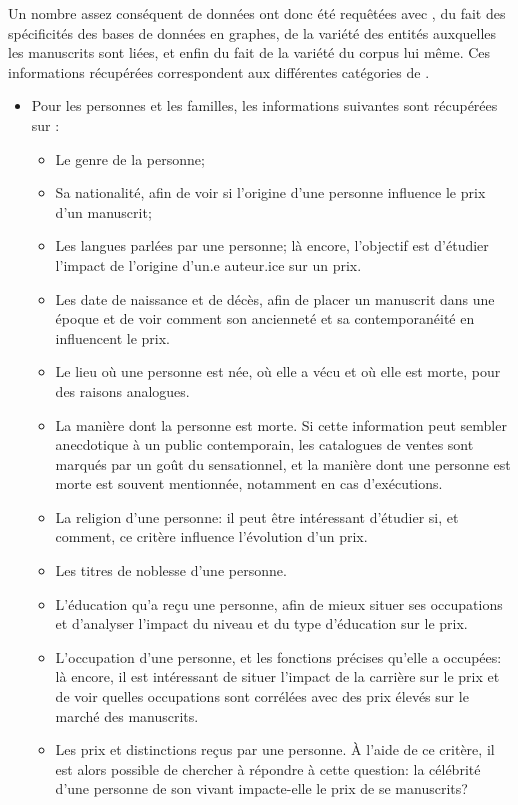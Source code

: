 Un nombre assez conséquent de données ont donc été requêtées avec \sparql{}, du fait des spécificités des bases de données en graphes, de la variété des entités \wkd{} auxquelles les manuscrits sont liées, et enfin du fait de la variété du corpus lui même. Ces informations récupérées correspondent aux différentes catégories de \wkd{}.
\begin{itemize}
	\item Pour les personnes et les familles, les informations suivantes sont récupérées sur \wkd{}:
	\begin{itemize}
		\item Le genre de la personne;
		\item Sa nationalité, afin de voir si l'origine d'une personne influence le prix d'un manuscrit;
		\item Les langues parlées par une personne; là encore, l'objectif est d'étudier l'impact de l'origine d'un.e auteur.ice sur un prix.
		\item Les date de naissance et de décès, afin de placer un manuscrit dans une époque et de voir comment son ancienneté et sa contemporanéité en influencent le prix.
		\item Le lieu où une personne est née, où elle a vécu et où elle est morte, pour des raisons analogues.
		\item La manière dont la personne est morte. Si cette information peut sembler anecdotique à un public contemporain, les catalogues de ventes sont marqués par un goût du sensationnel, et la manière dont une personne est morte est souvent mentionnée, notamment en cas d'exécutions.
		\item La religion d'une personne: il peut être intéressant d'étudier si, et comment, ce critère influence l'évolution d'un prix.
		\item Les titres de noblesse d'une personne.
		\item L'éducation qu'a reçu une personne, afin de mieux situer ses occupations et d'analyser l'impact du niveau et du type d'éducation sur le prix.
		\item L'occupation d'une personne, et les fonctions précises qu'elle a occupées: là encore, il est intéressant de situer l'impact de la carrière sur le prix et de voir quelles occupations sont corrélées avec des prix élevés sur le marché des manuscrits.
		\item Les prix et distinctions reçus par une personne. À l'aide de ce critère, il est alors possible de chercher à répondre à cette question: la célébrité d'une personne de son vivant impacte-elle le prix de se manuscrits?

\end{itemize}
\end{itemize}

